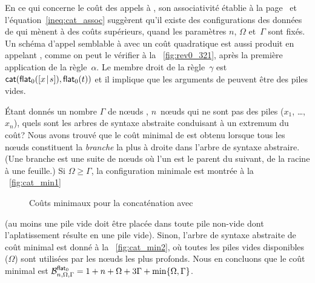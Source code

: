 En ce qui concerne le coût des appels à , son associativité
 établie à la page~\pageref{proof_assoc_cat} et
l'équation~\eqref{ineq:cat_assoc}  suggèrent
qu'il existe des configurations des données de
 qui mènent à des
coûts supérieurs, quand les paramètres \(n\), \(\Omega\) et~\(\Gamma\)
sont fixés. Un schéma d'appel semblable à
 avec un coût quadratique est aussi
produit en appelant ,
comme on peut le vérifier à la \fig~\vref{fig:rev0_321}, après la
première application de la règle~\(\alpha\). Le membre droit de la
règle~\(\gamma\) est
\(\fun{cat}(\fun{flat}_0(\cons{x}{s}),\fun{flat}_0(t))\)
 et il implique que les arguments de
 peuvent être des piles vides.

Étant donnés un nombre \(\Gamma\) de n{\oe}uds ,
\(n\)~n{\oe}uds qui ne sont pas des piles (\(x_1\), \dots, \(x_n\)),
quels sont les arbres de syntaxe abstraite conduisant à un extremum du
coût? Nous avons trouvé que le coût minimal de
 est obtenu lorsque tous les
n{\oe}uds  constituent la \emph{branche}
la plus à droite dans l'arbre de syntaxe abstraire. (Une branche est
une suite de n{\oe}uds où l'un est le parent du suivant, de la racine
à une feuille.) Si \(\Omega \geqslant \Gamma\), la configuration
minimale est montrée à la \fig~\ref{fig:cat_min1}
\begin{figure}
\centering
{}
\quad
{}
\caption{Coûts minimaux pour la concaténation avec }
\label{fig:cat_min}
\end{figure}
(au moins une pile vide doit être placée dans toute pile non-vide dont
l'aplatissement résulte en une pile vide). Sinon, l'arbre de syntaxe
abstraite de coût minimal est donné à la \fig~\ref{fig:cat_min2}, où
toutes les piles vides disponibles (\(\Omega\)) sont utilisées par les
n{\oe}uds  les plus profonds. Nous en concluons que le coût
minimal
est
\(\B{\fun{flat}_0}{n,\Omega,\Gamma} = 1 + n + \Omega + 3\Gamma +
\min\{\Omega,\Gamma\}\).


